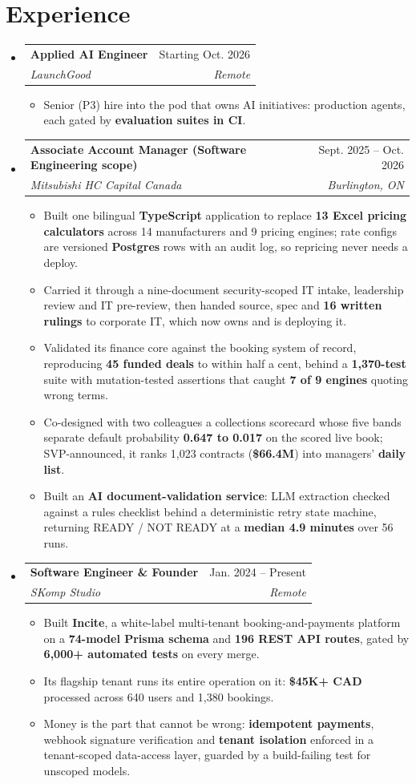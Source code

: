 \documentclass[letterpaper,11pt]{article}
\makeatletter
\newcommand{\resumeItem}[1]{
  \item\small{
    {#1\vspace{-2pt}}
  }
}
\newcommand{\resumeSubheading}[4]{
  \vspace{-2pt}\item
    \begin{tabular*}{0.97\textwidth}[t]{l@{\extracolsep{\fill}}r}
      \textbf{#1} & #2 \\
      \textit{\small#3} & \textit{\small #4} \\
    \end{tabular*}\vspace{-7pt}
}
\newcommand{\resumeSubHeadingListStart}{\begin{itemize}[leftmargin=0.15in, label={}]}
\newcommand{\resumeSubHeadingListEnd}{\end{itemize}}
\newcommand{\resumeItemListStart}{\begin{itemize}}
\newcommand{\resumeItemListEnd}{\end{itemize}\vspace{-5pt}}
\makeatother
\begin{document}
\section{Experience}
  \resumeSubHeadingListStart
    \resumeSubheading
      {Applied AI Engineer}{Starting Oct. 2026}
      {LaunchGood}{Remote}
      \resumeItemListStart
        \resumeItem{Senior (P3) hire into the pod that owns AI initiatives: production agents, each gated by \textbf{evaluation suites in CI}.}
      \resumeItemListEnd
    \resumeSubheading
      {Associate Account Manager (Software Engineering scope)}{Sept. 2025 -- Oct. 2026}
      {Mitsubishi HC Capital Canada}{Burlington, ON}
      \resumeItemListStart
        \resumeItem{Built one bilingual \textbf{TypeScript} application to replace \textbf{13 Excel pricing calculators} across 14 manufacturers and 9 pricing engines; rate configs are versioned \textbf{Postgres} rows with an audit log, so repricing never needs a deploy.}
        \resumeItem{Carried it through a nine-document security-scoped IT intake, leadership review and IT pre-review, then handed source, spec and \textbf{16 written rulings} to corporate IT, which now owns and is deploying it.}
        \resumeItem{Validated its finance core against the booking system of record, reproducing \textbf{45 funded deals} to within half a cent, behind a \textbf{1,370-test} suite with mutation-tested assertions that caught \textbf{7 of 9 engines} quoting wrong terms.}
        \resumeItem{Co-designed with two colleagues a collections scorecard whose five bands separate default probability \textbf{0.647 to 0.017} on the scored live book; SVP-announced, it ranks 1,023 contracts (\textbf{\$66.4M}) into managers' \textbf{daily list}.}
        \resumeItem{Built an \textbf{AI document-validation service}: LLM extraction checked against a rules checklist behind a deterministic retry state machine, returning READY / NOT READY at a \textbf{median 4.9 minutes} over 56 runs.}
      \resumeItemListEnd
    \resumeSubheading
      {Software Engineer \& Founder}{Jan. 2024 -- Present}
      {SKomp Studio}{Remote}
      \resumeItemListStart
        \resumeItem{Built \textbf{Incite}, a white-label multi-tenant booking-and-payments platform on a \textbf{74-model Prisma schema} and \textbf{196 REST API routes}, gated by \textbf{6,000+ automated tests} on every merge.}
        \resumeItem{Its flagship tenant runs its entire operation on it: \textbf{\$45K+ CAD} processed across 640 users and 1,380 bookings.}
        \resumeItem{Money is the part that cannot be wrong: \textbf{idempotent payments}, webhook signature verification and \textbf{tenant isolation} enforced in a tenant-scoped data-access layer, guarded by a build-failing test for unscoped models.}
      \resumeItemListEnd
  \resumeSubHeadingListEnd
\end{document}
